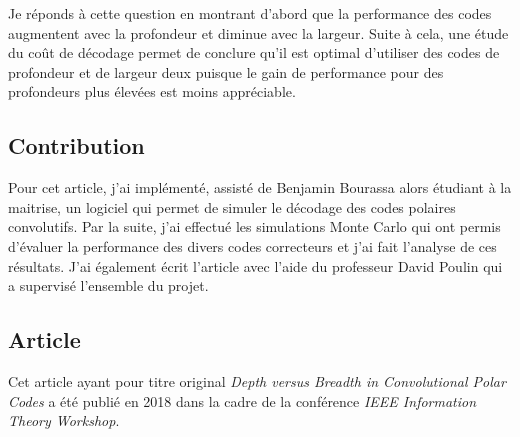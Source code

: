 Je réponds à cette question en montrant d'abord que la performance des codes 
augmentent avec la profondeur et diminue avec la largeur.
Suite à cela, une étude du coût de décodage permet de conclure qu'il est optimal
d'utiliser des codes de profondeur et de largeur deux puisque le gain de performance 
pour des profondeurs plus élevées est moins appréciable.

\subsection{Contribution}

Pour cet article,
j'ai implémenté, 
assisté de Benjamin Bourassa alors étudiant à la maitrise,
un logiciel qui permet de simuler le décodage des codes polaires convolutifs.
Par la suite,
j'ai effectué les simulations Monte Carlo qui ont permis d'évaluer la performance
des divers codes correcteurs et j'ai fait l'analyse de ces résultats.
J'ai également écrit l'article avec l'aide du professeur David Poulin
qui a supervisé l'ensemble du projet.

\subsection{Article}

Cet article ayant pour titre original \textit{Depth versus Breadth in Convolutional Polar Codes}
a été publié en 2018 dans la cadre de la conférence \textit{IEEE Information Theory Workshop}.


